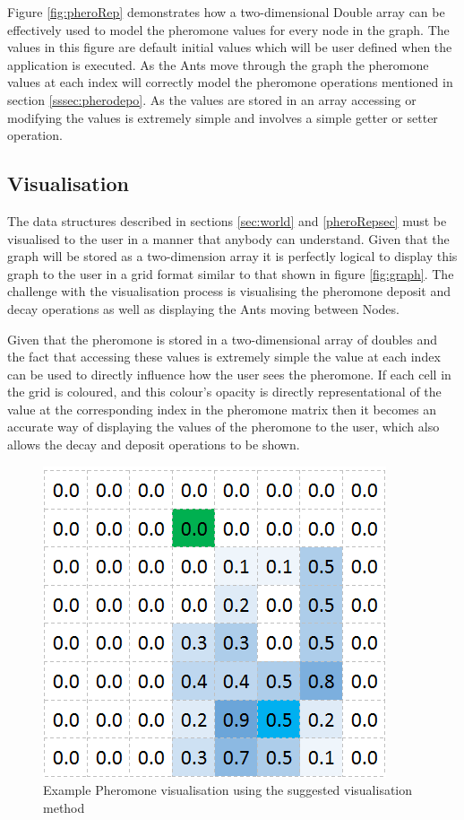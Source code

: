 \noindent
Figure \ref{fig:pheroRep} demonstrates how a two-dimensional Double array can be effectively used to model the pheromone values for every node in the graph. The values in this figure are default initial values which will be user defined when the application is executed. As the Ants move through the graph the pheromone values at each index will correctly model the pheromone operations mentioned in section \ref{sssec:pherodepo}. As the values are stored in an array accessing or modifying the values is extremely simple and involves a simple getter or setter operation.

\subsection{Visualisation}

The data structures described in sections \ref{sec:world} and \ref{pheroRepsec} must be visualised to the user in a manner that anybody can understand. Given that the graph will be stored as a two-dimension array it is perfectly logical to display this graph to the user in a grid format similar to that shown in figure \ref{fig:graph}. The challenge with the visualisation process is visualising the pheromone deposit and decay operations as well as displaying the Ants moving between Nodes.

Given that the pheromone is stored in a two-dimensional array of doubles and the fact that accessing these values is extremely simple the value at each index can be used to directly influence how the user sees the pheromone. If each cell in the grid is coloured, and this colour's opacity is directly representational of the value at the corresponding index in the pheromone matrix then it becomes an accurate way of displaying the values of the pheromone to the user, which also allows the decay and deposit operations to be shown.

\begin{figure}[H]
\centering
\includegraphics[scale=0.8]{Images/design/pheroEX}
\caption[Example Pheromone Visualisation]{Example Pheromone visualisation using the suggested visualisation method}
\label{fig:pheroVis}
\end{figure}

